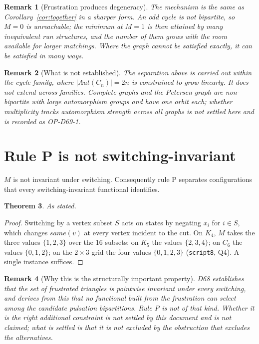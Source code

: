 \documentclass[11pt,a4paper]{article}
\def\mathrm#1{#1}%
\newtheorem{theorem}{Theorem}[section]
\newtheorem{remark}[theorem]{Remark}
\newcommand{\same}{\mathrm{same}}
\newcommand{\Aut}{\mathrm{Aut}}
\begin{document}
\begin{remark}[Frustration produces degeneracy]
\label{rem:frustdeg}
The mechanism is the same as Corollary~\ref{cor:together} in a sharper form. An odd cycle is not bipartite, so $M=0$ is unreachable; the minimum at $M=1$ is then attained by many inequivalent run structures, and the number of them grows with the room available for larger matchings. Where the graph cannot be satisfied exactly, it can be satisfied in many ways.
\end{remark}

\begin{remark}[What is not established]
\label{rem:notgeneral}
The separation above is carried out \emph{within} the cycle family, where $|\Aut(C_n)|=2n$ is constrained to grow linearly. It does not extend across families. Complete graphs and the Petersen graph are non-bipartite with large automorphism groups and have one orbit each; whether multiplicity tracks automorphism strength across all graphs is not settled here and is recorded as OP-D69-1.
\end{remark}

\section{Rule P is not switching-invariant}
\label{sec:switching}

\begin{theorembox}
$M$ is not invariant under switching. Consequently rule P separates configurations that every switching-invariant functional identifies.
\end{theorembox}

\begin{theorem}
\label{thm:switching}
As stated.
\end{theorem}

\begin{proof}
Switching by a vertex subset $S$ acts on states by negating $x_i$ for $i\in S$, which changes $\same(v)$ at every vertex incident to the cut. On $K_4$, $M$ takes the three values $\{1,2,3\}$ over the $16$ subsets; on $K_5$ the values $\{2,3,4\}$; on $C_6$ the values $\{0,1,2\}$; on the $2\times3$ grid the four values $\{0,1,2,3\}$ (\texttt{script8}, Q4). A single instance suffices.
\end{proof}

\begin{remark}[Why this is the structurally important property]
\label{rem:whyswitching}
D68 establishes that the set of frustrated triangles is pointwise invariant under every switching, and derives from this that no functional built from the frustration can select among the candidate pulsation bipartitions. Rule P is not of that kind. Whether it is the right additional constraint is not settled by this document and is not claimed; what is settled is that it is not excluded by the obstruction that excludes the alternatives.
\end{remark}
\end{document}
